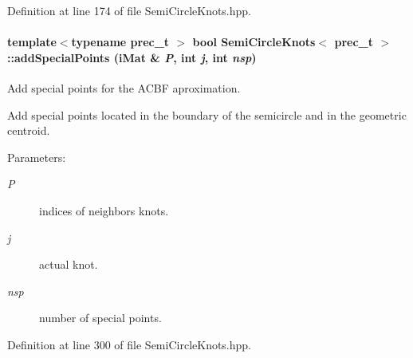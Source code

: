 Definition at line 174 of file SemiCircleKnots.hpp.\hypertarget{classSemiCircleKnots_ca6ce9f4726c9dbf661618fff8c296f8}{
\paragraph[{addSpecialPoints}]{\setlength{\rightskip}{0pt plus 5cm}template$<$typename prec\_\-t $>$ bool {\bf SemiCircleKnots}$<$ prec\_\-t $>$::addSpecialPoints ({\bf iMat} \& {\em P}, \/  int {\em j}, \/  int {\em nsp})}\hfill}
\label{classSemiCircleKnots_ca6ce9f4726c9dbf661618fff8c296f8}


Add special points for the ACBF aproximation. 

Add special points located in the boundary of the semicircle and in the geometric centroid.

\begin{Desc}
\item[Parameters:]
\begin{description}
\item[{\em P}]indices of neighbors knots. \item[{\em j}]actual knot. \item[{\em nsp}]number of special points. \end{description}
\end{Desc}


Definition at line 300 of file SemiCircleKnots.hpp.